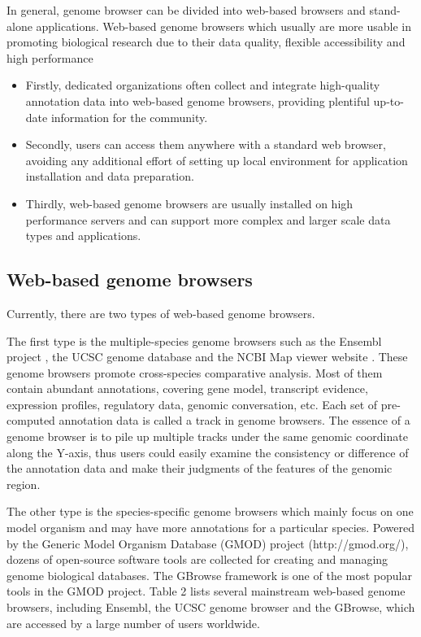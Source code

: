 In general, genome browser can be divided into web-based browsers and stand-alone applications. 
Web-based genome browsers which usually are more usable in promoting biological research due to their data quality, flexible accessibility and high performance
\begin{itemize}
	\item Firstly, dedicated organizations often collect and integrate high-quality annotation data into web-based genome browsers, providing plentiful up-to-date information for the community. 
	\item Secondly, users can access them anywhere with a standard web browser, avoiding any additional effort of setting up local environment for application installation and data preparation. 
	\item Thirdly, web-based genome browsers are usually installed on high performance servers and can support more complex and larger scale data types and applications. 
\end{itemize}

\subsection{Web-based genome browsers}

Currently, there are two types of web-based genome browsers. 

The first type is the multiple-species genome browsers such as the Ensembl project \cite{ENSEMBLgb}, the UCSC genome database \cite{UCSCgb} and the NCBI Map viewer website \cite{NCBIgb}.
These genome browsers promote cross-species comparative analysis. 
Most of them contain abundant annotations, covering gene model, transcript evidence, expression profiles, regulatory data, genomic conversation, etc. 
Each set of pre-computed annotation data is called a track in genome browsers. 
The essence of a genome browser is to pile up multiple tracks under the same genomic coordinate along the Y-axis, thus users could easily examine the consistency or difference of the annotation data and make their judgments of the features of the genomic region.

The other type is the species-specific genome browsers which mainly focus on one model organism and may have more annotations for a particular species. 
Powered by the Generic Model Organism Database (GMOD) project (http://gmod.org/), dozens of open-source software tools are collected for creating and managing genome biological databases.
The GBrowse framework \cite{GBrowse} is one of the most popular tools in the GMOD project. 
Table 2 lists several mainstream web-based genome browsers, including Ensembl, the UCSC genome browser and the GBrowse, which are accessed by a large number of users worldwide.

